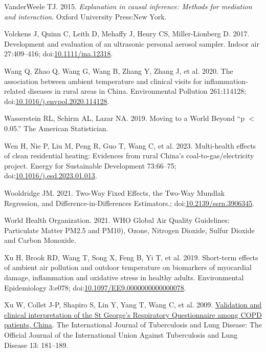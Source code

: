 \documentclass[
  letterpaper,
  DIV=11,
  numbers=noendperiod]{scrartcl}
\newlength{\cslhangindent}
\newenvironment{CSLReferences}[2] %
 {\begin{list}{}{%
  \setlength{\itemindent}{0pt}
  \setlength{\leftmargin}{0pt}
  \setlength{\parsep}{0pt}
  \ifodd #1
   \setlength{\leftmargin}{\cslhangindent}
   \setlength{\itemindent}{-1\cslhangindent}
  \fi
  \setlength{\itemsep}{#2\baselineskip}}}
 {\end{list}}
\begin{document}
\begin{CSLReferences}{1}{1}
VanderWeele TJ. 2015. \emph{Explanation in causal inference: Methods for
mediation and interaction}. Oxford University Press:New York.

Volckens J, Quinn C, Leith D, Mehaffy J, Henry CS, Miller-Lionberg D.
2017. Development and evaluation of an ultrasonic personal aerosol
sampler. Indoor air 27:409--416;
doi:\href{https://doi.org/10.1111/ina.12318}{10.1111/ina.12318}.

Wang Q, Zhao Q, Wang G, Wang B, Zhang Y, Zhang J, et al. 2020. The
association between ambient temperature and clinical visits for
inflammation-related diseases in rural areas in {China}. Environmental
Pollution 261:114128;
doi:\href{https://doi.org/10.1016/j.envpol.2020.114128}{10.1016/j.envpol.2020.114128}.

Wasserstein RL, Schirm AL, Lazar NA. 2019. Moving to a {World Beyond}
{``p {\(<\)} 0.05.''} The American Statistician.

Wen H, Nie P, Liu M, Peng R, Guo T, Wang C, et al. 2023. Multi-health
effects of clean residential heating: {Evidences} from rural {China}'s
coal-to-gas/electricity project. Energy for Sustainable Development
73:66--75;
doi:\href{https://doi.org/10.1016/j.esd.2023.01.013}{10.1016/j.esd.2023.01.013}.

Wooldridge JM. 2021. Two-{Way Fixed Effects}, the {Two-Way Mundlak
Regression}, and {Difference-in-Differences Estimators}.;
doi:\href{https://doi.org/10.2139/ssrn.3906345}{10.2139/ssrn.3906345}.

World Health Organization. 2021. {WHO Global Air Quality Guidelines}:
{Particulate Matter PM2}.5 and {PM10}), {Ozone}, {Nitrogen Dioxide},
{Sulfur Dioxide} and {Carbon Monoxide}.

Xu H, Brook RD, Wang T, Song X, Feng B, Yi T, et al. 2019. Short-term
effects of ambient air pollution and outdoor temperature on biomarkers
of myocardial damage, inflammation and oxidative stress in healthy
adults. Environmental Epidemiology 3:e078;
doi:\href{https://doi.org/10.1097/EE9.0000000000000078}{10.1097/EE9.0000000000000078}.

Xu W, Collet J-P, Shapiro S, Lin Y, Yang T, Wang C, et al. 2009.
\href{https://www.ncbi.nlm.nih.gov/pubmed/19146745}{Validation and
clinical interpretation of the {St George}'s {Respiratory Questionnaire}
among {COPD} patients, {China}}. The International Journal of
Tuberculosis and Lung Disease: The Official Journal of the International
Union Against Tuberculosis and Lung Disease 13: 181--189.


\end{CSLReferences}
\end{document}
